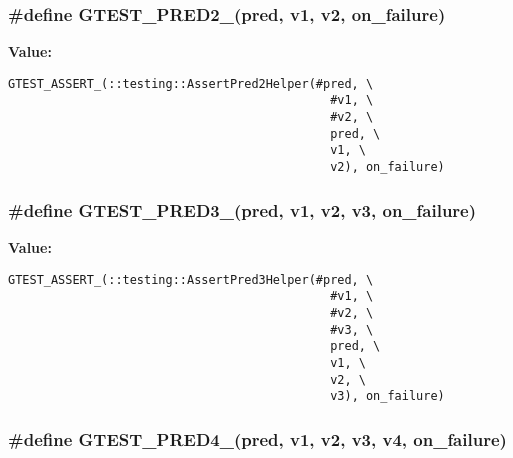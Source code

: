 \subsubsection{\setlength{\rightskip}{0pt plus 5cm}\#define GTEST\_\-PRED2\_\-(pred, v1, v2, on\_\-failure)}\label{gtest__pred__impl_8h_212427e5889f40469e842bfc5510d04d}


\textbf{Value:}

\begin{Code}\begin{verbatim}GTEST_ASSERT_(::testing::AssertPred2Helper(#pred, \
                                             #v1, \
                                             #v2, \
                                             pred, \
                                             v1, \
                                             v2), on_failure)
\end{verbatim}
\end{Code}
\subsubsection{\setlength{\rightskip}{0pt plus 5cm}\#define GTEST\_\-PRED3\_\-(pred, v1, v2, v3, on\_\-failure)}\label{gtest__pred__impl_8h_1a5b8d39351f3ca4feaac2f24e0162ae}


\textbf{Value:}

\begin{Code}\begin{verbatim}GTEST_ASSERT_(::testing::AssertPred3Helper(#pred, \
                                             #v1, \
                                             #v2, \
                                             #v3, \
                                             pred, \
                                             v1, \
                                             v2, \
                                             v3), on_failure)
\end{verbatim}
\end{Code}
\subsubsection{\setlength{\rightskip}{0pt plus 5cm}\#define GTEST\_\-PRED4\_\-(pred, v1, v2, v3, v4, on\_\-failure)}\label{gtest__pred__impl_8h_0254fa4898c5bc62886cced1dc69227a}


